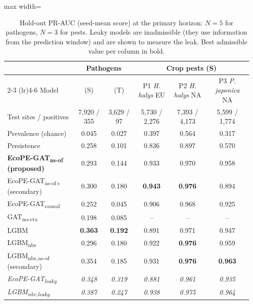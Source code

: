 \documentclass[a4paper,fleqn]{cas-sc}
\newcommand{\Masof}{\mbox{EcoPE-GAT\textsubscript{as-of}}}
\newcommand{\Masofplus}{\mbox{EcoPE-GAT\textsubscript{as-of+}}}
\newcommand{\Mcausal}{\mbox{EcoPE-GAT\textsubscript{causal}}}
\newcommand{\Mleaky}{\mbox{EcoPE-GAT\textsubscript{leaky}}}
\newcommand{\Mnoctx}{\mbox{GAT\textsubscript{no-ctx}}}
\newcommand{\Lg}{\mbox{LGBM}}
\newcommand{\Lnbr}{\mbox{LGBM\textsubscript{nbr}}}
\newcommand{\Lleaky}{\mbox{LGBM\textsubscript{nbr,leaky}}}
\newcommand{\Lasof}{\mbox{LGBM\textsubscript{nbr,as-of}}}
\begin{document}
\begin{table}[t]
\centering
\caption{Hold-out PR-AUC (seed-mean score) at the primary horizon: $N=5$ for pathogens, $N=3$ for pests. Leaky models are inadmissible (they use information from the prediction window) and are shown to measure the leak. Best admissible value per column in bold.}
\label{tab:holdout}
\small
\begin{adjustbox}{max width=\linewidth}
\begin{tabular}{lccccc}
\toprule
 & \multicolumn{2}{c}{Pathogens} & \multicolumn{3}{c}{Crop pests (S)} \\
\cmidrule(lr){2-3} \cmidrule(lr){4-6}
Model & (S) & (T) & P1 \textit{H. halys} EU & P2 \textit{H. halys} NA & P3 \textit{P. japonica} NA \\
\midrule
Test sites / positives & 7{,}920 / 355 & 3{,}629 / 97 & 5{,}730 / 2{,}276 & 7{,}393 / 4{,}173 & 5{,}599 / 1{,}774 \\
Prevalence (chance)   & 0.045 & 0.027 & 0.397 & 0.564 & 0.317 \\
Persistence           & 0.258 & 0.101 & 0.836 & 0.897 & 0.570 \\
\midrule
\textbf{\Masof{} (proposed)} & 0.293 & 0.144 & 0.933 & 0.970 & 0.958 \\
\Masofplus{} (secondary)     & 0.300 & 0.180 & \textbf{0.943} & \textbf{0.976} & 0.894 \\
\Mcausal                     & 0.252 & 0.045 & 0.906 & 0.968 & 0.925 \\
\Mnoctx                      & 0.198 & 0.085 & -- & -- & -- \\
\midrule
\Lg                          & \textbf{0.363} & \textbf{0.192} & 0.891 & 0.971 & 0.947 \\
\Lnbr                        & 0.296 & 0.180 & 0.922 & \textbf{0.976} & 0.959 \\
\Lasof{} (secondary)         & 0.354 & 0.185 & 0.931 & \textbf{0.976} & \textbf{0.963} \\
\midrule
\textit{\Mleaky}             & \textit{0.348} & \textit{0.319} & \textit{0.881} & \textit{0.961} & \textit{0.935} \\
\textit{\Lleaky}             & \textit{0.387} & \textit{0.247} & \textit{0.938} & \textit{0.975} & \textit{0.964} \\
\bottomrule
\end{tabular}
\end{adjustbox}
\end{table}
\end{document}

